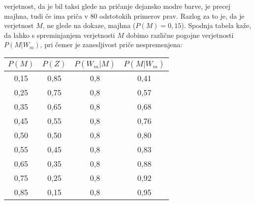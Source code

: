 \documentclass[12pt,a4paper]{amsart}
\theoremstyle{definition} %
\theoremstyle{plain} %
\begin{document}
verjetnost, da je bil taksi glede na pričanje dejansko modre barve, je precej majhna, tudi če ima priča v 80 odstotokih primerov prav. Razlog za to je, 
da je verjetnost $M$, ne glede na dokaze, majhna ($P(M)=0,15$). Spodnja tabela kaže, da lahko s spreminjanjem verjetnosti $M$ dobimo različne pogojne 
verjetnosti $P(M \lvert W_m)$, pri čemer je zanesljivost priče nespremenjena:

\begin{table}[h!]
\centering
\begin{tabular}{c c c c} 
\hline
$P(M)$ & $P(Z)$ & $P(W_m \lvert M)$ & $P(M \lvert W_m)$ \\ 
\hline
0,15 & 0,85 & 0,8 & 0,41 \\
0,25 & 0,75 & 0,8 & 0,57 \\
0,35 & 0,65 & 0,8 & 0,68 \\
0,45 & 0,55 & 0,8 & 0,76 \\
0,50 & 0,50 & 0,8 & 0,80 \\
0,55 & 0,45 & 0,8 & 0,83 \\
0,65 & 0,35 & 0,8 & 0,88 \\
0,75 & 0,25 & 0,8 & 0,92 \\
0,85 & 0,15 & 0,8 & 0,95 \\
\hline
\end{tabular}
\end{table}


\end{document}
